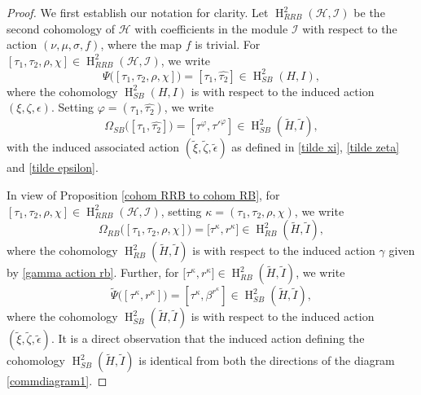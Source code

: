 \documentclass{jonasart}
\theoremstyle{plain}
\DeclareMathOperator{\Ho}{H}
\begin{document}
	\begin{proof}
		We first establish our notation for clarity. Let $\Ho^2_{RRB}(\mathcal{H},\mathcal{I})$ be the second cohomology of  $\mathcal{H}$ with coefficients in the module  $\mathcal{I}$ with respect to the action $(\nu,\mu,\sigma,f)$, where the map $f$ is trivial. 	 For $[\tau_1,\tau_2,\rho,\chi]\in \Ho^2_{RRB}(\mathcal{H},\mathcal{I})$, we write
		$$\Psi \big([\tau_1,\tau_2,\rho,\chi] \big)=[\tau_1,\hat{\tau_2}] \in \Ho^2_{SB}(H,I),$$
		where the cohomology $\Ho^2_{SB}(H,I)$ is with respect to the induced action $(\xi,\zeta,\epsilon)$. Setting $\varphi=(\tau_1,\hat{\tau_2})$, we write
		$$\Omega_{SB}\big([\tau_1,\hat{\tau_2}] \big)=[\tau^\varphi,\tau'^\varphi] \in\Ho^2_{SB}(\widetilde{H},\widetilde{I}),$$
		with the induced associated action $(\tilde{\xi},\tilde{\zeta},\tilde{\epsilon})$ as defined in \eqref{tilde xi}, \eqref{tilde zeta} and \eqref{tilde epsilon}.
		
		In view of Proposition \ref{cohom RRB to cohom RB}, for $[\tau_1,\tau_2,\rho,\chi]\in \Ho^2_{RRB}(\mathcal{H},\mathcal{I})$, setting $\kappa=(\tau_1,\tau_2,\rho,\chi)$, we write
		$$\Omega_{RB} \big([\tau_1,\tau_2,\rho,\chi]\big)= \big[\tau^{\kappa},r^{\kappa}\big] \in \Ho^2_{RB}(\widetilde{H},\widetilde{I}),$$
		where the cohomology $\Ho^2_{RB}(\widetilde{H},\widetilde{I})$  is with respect to the induced action $\gamma$ given by \eqref{gamma action rb}. Further, for $\big[\tau^{\kappa},r^{\kappa}\big]\in \Ho^2_{RB}(\widetilde{H},\widetilde{I})$, we write
		$$\widetilde{\Psi}\big([\tau^{\kappa},r^{\kappa}]\big)=[\tau^\kappa,\beta^{r^\kappa}] \in\Ho^2_{SB}(\widetilde{H},\widetilde{I}),$$
		where the cohomology $\Ho^2_{SB}(\widetilde{H},\widetilde{I})$ is with respect to the induced action  $(\widetilde{\xi},\widetilde{\zeta},\widetilde{\epsilon})$.  It is a direct observation that  the induced action defining the cohomology  $\Ho^2_{SB}(\widetilde{H},\widetilde{I})$ is identical from both the directions of the diagram \eqref{commdiagram1}.
		

\end{proof}
\end{document}
